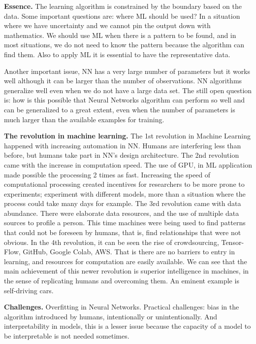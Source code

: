 \documentclass[9pt,a4paper]{article}
\begin{document}
\textbf{Essence.} The learning algorithm is constrained by the boundary based on the data.
Some important questions are: where ML should be used? 
In a situation where we have uncertainty and we cannot pin the output down with mathematics.
We should use ML when there is a pattern to be found, and in most situations, we do not need to know the pattern because the algorithm can find them.
Also to apply ML it is essential to have the representative data.  

Another important issue, NN has a very large number of parameters but it works well although it can be larger than the number of observations. NN algorithms generalize well even when we do not have a large data set. 
The still open question is: how is this possible that Neural Networks algorithm can perform so well and can be generalized to a great extent, even when the number of parameters is much larger than the available examples for training.

\textbf{The revolution in machine learning.} 
The 1st revolution in Machine Learning happened with increasing automation in NN. 
Humans are interfering less than before, but humans take part in NN's design architecture. 
The 2nd revolution came with the increase in computation speed. 
The use of GPU, in ML application made possible the processing 2 times as fast. 
Increasing the speed of computational processing created incentives for researchers to be more prone to experiments; experiment with different models, more than a situation where the process could take many days for example.
The 3rd revolution came with data abundance. There were elaborate data resources, and the use of multiple data sources to profile a person. This time machines were being used to find patterns that could not be foreseen by humans, that is, find relationships that were not obvious. 
In the 4th revolution, it can be seen the rise of crowdsourcing, Tensor-Flow, GitHub, Google Colab, AWS. That is there are no barriers to entry in learning, and resources for computation are easily available.
We can see that the main achievement of this newer revolution is
superior intelligence in machines, in the sense of replicating humans and overcoming them. An eminent example is self-driving cars.

\textbf{Challenges.} Overfitting in Neural Networks.
Practical challenges: bias in the algorithm introduced by humans, intentionally or unintentionally. And interpretability in models, this is a lesser issue because the capacity of a model to be interpretable is not needed sometimes. 
\end{document}
